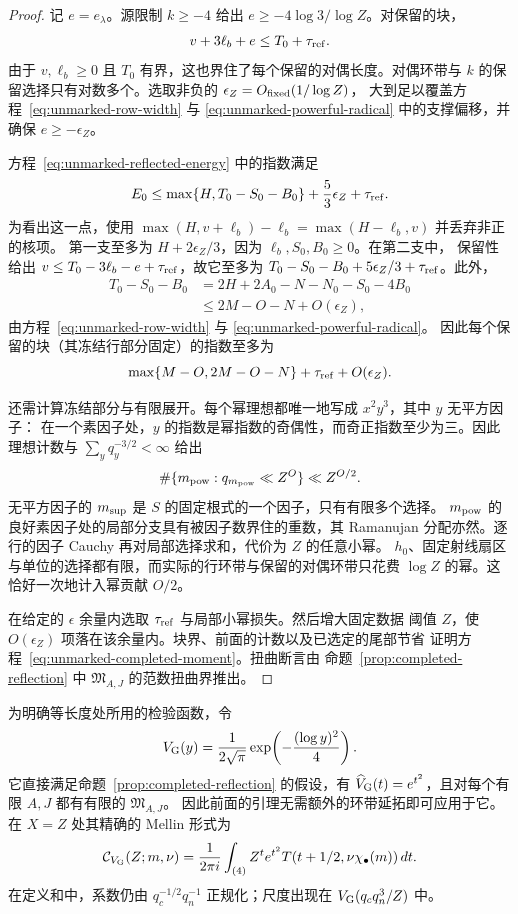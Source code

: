 \begin{proof}
记 $e=e_\lambda$。源限制 $k\ge-4$ 给出 $e\ge-4\log 3/\log Z$。对保留的块，
\[
 v+3\ell_b+e\le T_0+\tau_{\rm ref}.
\]
由于 $v,\ell_b\ge0$ 且 $T_0$ 有界，这也界住了每个保留的对偶长度。对偶环带与 $k$
的保留选择只有对数多个。选取非负的 $\epsilon_Z=O_{\rm fixed}(1/\log Z)$，
大到足以覆盖方程~\eqref{eq:unmarked-row-width} 与
\eqref{eq:unmarked-powerful-radical} 中的支撑偏移，并确保 $e\ge-\epsilon_Z$。

方程~\eqref{eq:unmarked-reflected-energy} 中的指数满足
\[
 E_0\le\max\{H,T_0-S_0-B_0\}+\frac53\epsilon_Z+\tau_{\rm ref}.
\]
为看出这一点，使用 $\max(H,v+\ell_b)-\ell_b=\max(H-\ell_b,v)$ 并丢弃非正的核项。
第一支至多为 $H+2\epsilon_Z/3$，因为 $\ell_b,S_0,B_0\ge0$。在第二支中，
保留性给出 $v\le T_0-3\ell_b-e+\tau_{\rm ref}$，故它至多为
$T_0-S_0-B_0+5\epsilon_Z/3+\tau_{\rm ref}$。此外，
\[
 \begin{split}
 T_0-S_0-B_0
 &=2H+2A_0-N-N_0-S_0-4B_0\\
 &\le 2M-O-N+O(\epsilon_Z),
 \end{split}
\]
由方程~\eqref{eq:unmarked-row-width} 与 \eqref{eq:unmarked-powerful-radical}。
因此每个保留的块（其冻结行部分固定）的指数至多为
\[
 \max\{M-O,2M-O-N\}+\tau_{\rm ref}+O(\epsilon_Z).
\]

还需计算冻结部分与有限展开。每个幂理想都唯一地写成 $x^2y^3$，其中 $y$ 无平方因子：
在一个素因子处，$y$ 的指数是幂指数的奇偶性，而奇正指数至少为三。因此理想计数与
$\sum_yq_y^{-3/2}<\infty$ 给出
\[
 \#\{m_{\rm pow}:q_{m_{\rm pow}}\ll Z^O\}\ll Z^{O/2}.
\]
无平方因子的 $m_{\rm sup}$ 是 $S$ 的固定根式的一个因子，只有有限多个选择。
$m_{\rm pow}$ 的良好素因子处的局部分支具有被因子数界住的重数，其 Ramanujan
分配亦然。逐行的因子 Cauchy 再对局部选择求和，代价为 $Z$ 的任意小幂。
$h_0$、固定射线扇区与单位的选择都有限，而实际的行环带与保留的对偶环带只花费
$\log Z$ 的幂。这恰好一次地计入幂贡献 $O/2$。

在给定的 $\epsilon$ 余量内选取 $\tau_{\rm ref}$ 与局部小幂损失。然后增大固定数据
阈值 $Z$，使 $O(\epsilon_Z)$ 项落在该余量内。块界、前面的计数以及已选定的尾部节省
证明方程~\eqref{eq:unmarked-completed-moment}。扭曲断言由
命题~\ref{prop:completed-reflection} 中 $\mathfrak M_{A,J}$ 的范数扭曲界推出。
\end{proof}

为明确等长度处所用的检验函数，令
\[
 V_{\rm G}(y)=\frac1{2\sqrt\pi}
           \exp\!\left(-\frac{(\log y)^2}{4}\right).
\]
它直接满足命题~\ref{prop:completed-reflection} 的假设，有
$\widehat V_{\rm G}(t)=e^{t^2}$，且对每个有限 $A,J$ 都有有限的 $\mathfrak M_{A,J}$。
因此前面的引理无需额外的环带延拓即可应用于它。在 $X=Z$ 处其精确的 Mellin 形式为
\[
 \mathcal C_{V_{\rm G}}(Z;m,\nu)=\frac1{2\pi i}\int_{(4)}
       Z^t e^{t^2}T(t+1/2,\nu\chi_\bullet(m))\,dt.
\]
在定义和中，系数仍由 $q_c^{-1/2}q_n^{-1}$ 正规化；尺度出现在
$V_{\rm G}(q_cq_n^3/Z)$ 中。


